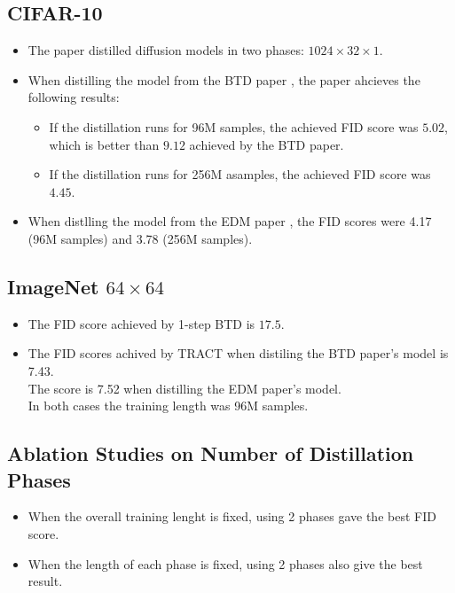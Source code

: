 \documentclass[10pt]{article}
\begin{document}
\subsection{CIFAR-10}

\begin{itemize}
  \item The paper distilled diffusion models in two phases: $1024 \times 32 \times 1$.
  
  \item When distilling the model from the BTD paper \cite{Salimans:2022}, the paper ahcieves the following results:
  \begin{itemize}
    \item If the distillation runs for 96M samples, the achieved FID score was $5.02$, which is better than $9.12$ achieved by the BTD paper.
    
    \item If the distillation runs for 256M asamples, the achieved FID score was $4.45$.
  \end{itemize}

  \item When distlling the model from the EDM paper \cite{Karras:2022}, the FID scores were 4.17 (96M samples) and 3.78 (256M samples).
\end{itemize}

\subsection{ImageNet $64\times64$}

\begin{itemize}
  \item The FID score achieved by 1-step BTD is $17.5$.
  
  \item The FID scores achived by TRACT when distiling the BTD paper's model is 7.43.\\
  The score is 7.52 when distilling the EDM paper's model.\\
  In both cases the training length was 96M samples.
\end{itemize}

\subsection{Ablation Studies on Number of Distillation Phases}

\begin{itemize}
  \item When the overall training lenght is fixed, using 2 phases gave the best FID score.
  
  \item When the length of each phase is fixed, using 2 phases also give the best result.
\end{itemize}


  
\end{document}
